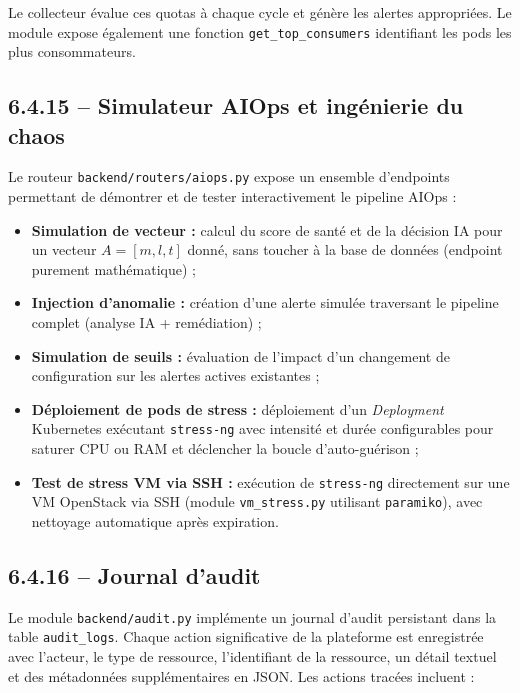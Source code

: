 \documentclass[11pt,a4paper]{report}
\begin{document}
Le collecteur évalue ces quotas à chaque cycle et génère les alertes
appropriées. Le module expose également une fonction
\texttt{get\_top\_consumers} identifiant les pods les plus consommateurs.

\subsection*{6.4.15 -- Simulateur AIOps et ingénierie du chaos}

Le routeur \texttt{backend/routers/aiops.py} expose un ensemble d'endpoints
permettant de démontrer et de tester interactivement le pipeline AIOps :

\begin{itemize}[label=\textbullet, leftmargin=1.5cm, labelsep=0.5cm,
                itemsep=0.1em, parsep=0em, topsep=0.2em]
    \item \textbf{Simulation de vecteur :} calcul du score de santé et de la
    décision IA pour un vecteur $A = [m, l, t]$ donné, sans toucher à la
    base de données (endpoint purement mathématique) ;
    \item \textbf{Injection d'anomalie :} création d'une alerte simulée
    traversant le pipeline complet (analyse IA + remédiation) ;
    \item \textbf{Simulation de seuils :} évaluation de l'impact d'un
    changement de configuration sur les alertes actives existantes ;
    \item \textbf{Déploiement de pods de stress :} déploiement d'un
    \textit{Deployment} Kubernetes exécutant \texttt{stress-ng} avec
    intensité et durée configurables pour saturer CPU ou RAM et déclencher
    la boucle d'auto-guérison ;
    \item \textbf{Test de stress VM via SSH :} exécution de
    \texttt{stress-ng} directement sur une VM OpenStack via SSH (module
    \texttt{vm\_stress.py} utilisant \texttt{paramiko}), avec nettoyage
    automatique après expiration.
\end{itemize}

\subsection*{6.4.16 -- Journal d'audit}

Le module \texttt{backend/audit.py} implémente un journal d'audit persistant
dans la table \texttt{audit\_logs}. Chaque action significative de la
plateforme est enregistrée avec l'acteur, le type de ressource, l'identifiant
de la ressource, un détail textuel et des métadonnées supplémentaires en JSON.
Les actions tracées incluent :
\end{document}
